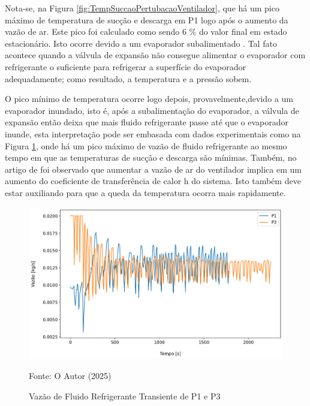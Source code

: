 Nota-se, na Figura \ref{fig:TempSuccaoPertubacaoVentilador}, que há um pico máximo de temperatura de sucção e descarga em P1 logo após o aumento da vazão de ar. Este pico foi calculado como sendo 6 \% do valor final em estado estacionário. Isto ocorre devido a um evaporador subalimentado \cite{StoekerRefrigeration}. Tal fato acontece quando a válvula de expansão não consegue alimentar o evaporador com refrigerante o suficiente para refrigerar a superfície do evaporador adequadamente; como resultado, a temperatura e a pressão sobem.

O pico mínimo de temperatura ocorre logo depois, provavelmente,devido a um evaporador inundado, isto é, após a subalimentação do evaporador, a válvula de expansão então deixa que mais fluido refrigerante passe até que o evaporador inunde, esta interpretação pode ser embasada com dados experimentais como na Figura \ref{fig:VazãodeFluidoPerturbaçãoVentilador}, onde há um pico máximo de vazão de fluido refrigerante ao mesmo tempo em que as temperaturas de sucção e descarga são mínimas. Também, no artigo de \textcite{VaryingFanSpeedCavallaro} foi observado que aumentar a vazão de ar do ventilador implica em um aumento do coeficiente de transferência de calor h do sistema. Isto também deve estar auxiliando para que a queda da temperatura ocorra mais rapidamente.
\newpage
\begin{figure}[h]
    \centering
    \includegraphics[width=1\linewidth]{FigurasdoTexto/VazãodeFluidoPerturbaçãoVentilador.png}
    \caption{Vazão de Fluido Refrigerante Transiente de P1 e P3}
    \label{fig:VazãodeFluidoPerturbaçãoVentilador}
    {\footnotesize Fonte: O Autor (2025)}
\end{figure}

